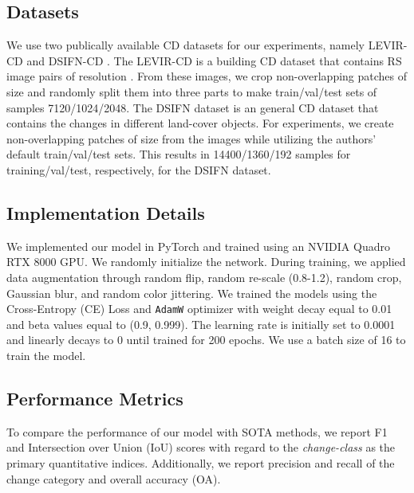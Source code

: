 \documentclass{article}
\begin{document}
\subsection{Datasets} 
We use two publically available CD datasets for our experiments, namely LEVIR-CD \cite{LEVIR} and DSIFN-CD \cite{DSIFN}. The LEVIR-CD is a building CD dataset that contains  RS image pairs of resolution . From these images, we crop non-overlapping patches of size  and randomly split them into three parts to make train/val/test sets of samples 7120/1024/2048. The DSIFN dataset is an general CD dataset that contains the changes in different land-cover objects. For experiments, we create non-overlapping patches of size  from the  images while utilizing the authors' default train/val/test sets. This results in 14400/1360/192 samples for training/val/test, respectively, for the DSIFN dataset. 

\subsection{Implementation Details} 
We implemented our model in PyTorch and trained using an NVIDIA Quadro RTX 8000 GPU. We randomly initialize the network. During training, we applied data augmentation through random flip, random re-scale (0.8-1.2), random crop, Gaussian blur, and random color jittering. We trained the models using the Cross-Entropy (CE) Loss and \texttt{AdamW} optimizer with weight decay equal to 0.01 and beta values equal to (0.9, 0.999). The learning rate is initially set to 0.0001 and linearly decays to 0 until trained for 200 epochs. We use a batch size of 16 to train the model. 

\subsection{Performance Metrics} To compare the performance of our model with SOTA methods, we report F1 and Intersection over Union (IoU) scores with regard to the \textit{change-class} as the primary quantitative indices. Additionally,  we report precision and recall of the change category and overall accuracy (OA).
\end{document}
